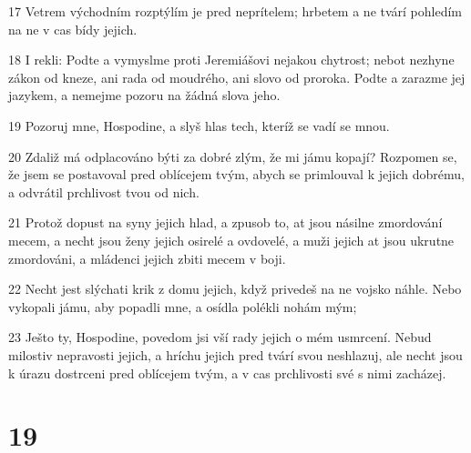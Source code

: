 \par 17 Vetrem východním rozptýlím je pred neprítelem; hrbetem a ne tvárí pohledím na ne v cas bídy jejich.
\par 18 I rekli: Podte a vymyslme proti Jeremiášovi nejakou chytrost; nebot nezhyne zákon od kneze, ani rada od moudrého, ani slovo od proroka. Podte a zarazme jej jazykem, a nemejme pozoru na žádná slova jeho.
\par 19 Pozoruj mne, Hospodine, a slyš hlas tech, kteríž se vadí se mnou.
\par 20 Zdaliž má odplacováno býti za dobré zlým, že mi jámu kopají? Rozpomen se, že jsem se postavoval pred oblícejem tvým, abych se primlouval k jejich dobrému, a odvrátil prchlivost tvou od nich.
\par 21 Protož dopust na syny jejich hlad, a zpusob to, at jsou násilne zmordování mecem, a necht jsou ženy jejich osirelé a ovdovelé, a muži jejich at jsou ukrutne zmordováni, a mládenci jejich zbiti mecem v boji.
\par 22 Necht jest slýchati krik z domu jejich, když privedeš na ne vojsko náhle. Nebo vykopali jámu, aby popadli mne, a osídla polékli nohám mým;
\par 23 Ješto ty, Hospodine, povedom jsi vší rady jejich o mém usmrcení. Nebud milostiv nepravosti jejich, a hríchu jejich pred tvárí svou neshlazuj, ale necht jsou k úrazu dostrceni pred oblícejem tvým, a v cas prchlivosti své s nimi zacházej.

\chapter{19}

